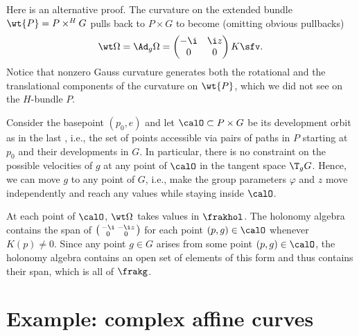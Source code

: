 Here is an alternative proof. The curvature on the extended bundle $\wt{P}=P\times^H G$ pulls back to $P\times G$ to become (omitting obvious pullbacks)
\[
    \wt\Omega=\Ad_g\Omega=\begin{pmatrix}
        -\i & \i z \\ 0 & 0
    \end{pmatrix}K\sfv.
\]
Notice that nonzero Gauss curvature generates both the rotational and the translational components of the curvature on $\wt{P}$, which we did not see on the $H$-bundle $P$.

Consider the basepoint $(p_0,e)$ and let $\calO \subset P\times G$ be its development orbit as in the last \sect, i.e., the set of points accessible via pairs of paths in $P$ starting at $p_0$ and their developments in $G$. In particular, there is no constraint on the possible velocities of $g$ at any point of $\calO$ in the tangent space $\T_g G$. Hence, we can move $g$ to any point of $G$, i.e., make the group parameters $\varphi$ and $z$ move independently and reach any values while staying inside $\calO$.

At each point of $\calO$, $\wt\Omega$ takes values in $\frakhol$. The holonomy algebra contains the span of $\left(\begin{smallmatrix}
    -\i & -\i z \\ 0 & 0
\end{smallmatrix}\right)$ for each point $(p,g)\in \calO$ whenever $K(p)\neq 0$. Since any point $g\in G$ arises from some point $(p,g)\in \calO$, the holonomy algebra contains an open set of elements of this form and thus contains their span, which is all of $\frakg$.




\section{Example: complex affine curves}

